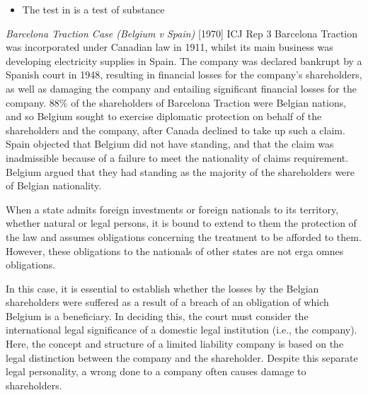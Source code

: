 \begin{itemize}
    \item The test in  is a test of substance
\end{itemize}


\begin{casedetails}{\textit{Barcelona Traction Case (Belgium v Spain)} [1970] ICJ Rep 3}
    \flushleft
    Barcelona Traction was incorporated under Canadian law in 1911, whilst its main business was developing electricity supplies in Spain. The company was declared bankrupt by a Spanish court in 1948, resulting in financial losses for the company's shareholders, as well as damaging the company and entailing significant financial losses for the company. 88\% of the shareholders of Barcelona Traction were Belgian nations, and so Belgium sought to exercise diplomatic protection on behalf of the shareholders and the company, after Canada declined to take up such a claim. Spain objected that Belgium did not have standing, and that the claim was inadmissible because of a failure to meet the nationality of claims requirement. Belgium argued that they had standing as the majority of the shareholders were of Belgian nationality.

    \vspace{\baselineskip}

    When a state admits foreign investments or foreign nationals to its territory, whether natural or legal persons, it is bound to extend to them the protection of the law and assumes obligations concerning the treatment to be afforded to them. However, these obligations to the nationals of other states are not \gls{erga omnes} obligations.

    \vspace{\baselineskip}

    In this case, it is essential to establish whether the losses by the Belgian shareholders were suffered as a result of a breach of an obligation of which Belgium is a beneficiary. In deciding this, the court must consider the international legal significance of a domestic legal institution (i.e., the company). Here, the concept and structure of a limited liability company is based on the legal distinction between the company and the shareholder. Despite this separate legal personality, a wrong done to a company often causes damage to shareholders.

    \vspace{\baselineskip}


\end{casedetails}
